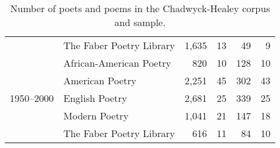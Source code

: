 \begin{table}[t]
{\begin{tabular}{llrrrr}
   & The Faber Poetry Library & 1,635 & 13 & 49 & 9 \\
  \cline{1-6}
  \multirow[t]{5}{*}{1950--2000} & African-American Poetry & 820 & 10 & 128 & 10 \\
   & American Poetry & 2,251 & 45 & 302 & 43 \\
   & English Poetry & 2,681 & 25 & 339 & 25 \\
   & Modern Poetry & 1,041 & 21 & 147 & 18 \\
   & The Faber Poetry Library & 616 & 11 & 84 & 10 \\
  \bottomrule
  \end{tabular}
  }
  \caption{Number of poets and poems in the Chadwyck-Healey corpus and sample.}
  \label{tab:num_poems_corpus}
\end{table}